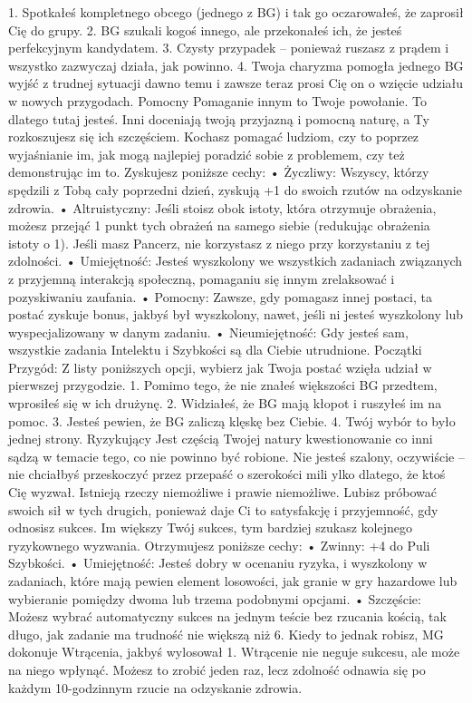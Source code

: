 1. Spotkałeś kompletnego obcego (jednego z BG) i tak go oczarowałeś, że zaprosił Cię do grupy.
2. BG szukali kogoś innego, ale przekonałeś ich, że jesteś perfekcyjnym kandydatem.
3. Czysty przypadek – ponieważ ruszasz z prądem i wszystko zazwyczaj działa, jak powinno.
4. Twoja charyzma pomogła jednego BG wyjść z trudnej sytuacji dawno temu i zawsze teraz prosi Cię on o wzięcie udziału w nowych przygodach.
Pomocny
Pomaganie innym to Twoje powołanie. To dlatego tutaj jesteś. Inni doceniają twoją przyjazną i pomocną naturę, a Ty rozkoszujesz się ich szczęściem. Kochasz pomagać ludziom, czy to poprzez wyjaśnianie im, jak mogą najlepiej poradzić sobie z problemem, czy też demonstrując im to.
Zyskujesz poniższe cechy:
    • Życzliwy: Wszyscy, którzy spędzili z Tobą cały poprzedni dzień, zyskują +1 do swoich rzutów na odzyskanie zdrowia.
    • Altruistyczny: Jeśli stoisz obok istoty, która otrzymuje obrażenia, możesz przejąć 1 punkt tych obrażeń na samego siebie (redukując obrażenia istoty o 1). Jeśli masz Pancerz, nie korzystasz z niego przy korzystaniu z tej zdolności.
    • Umiejętność: Jesteś wyszkolony we wszystkich zadaniach związanych z przyjemną interakcją społeczną, pomaganiu się innym zrelaksować i pozyskiwaniu zaufania.
    • Pomocny: Zawsze, gdy pomagasz innej postaci, ta postać zyskuje bonus, jakbyś był wyszkolony, nawet, jeśli ni jesteś wyszkolony lub wyspecjalizowany w danym zadaniu.
    • Nieumiejętność: Gdy jesteś sam, wszystkie zadania Intelektu i Szybkości są dla Ciebie utrudnione.
Początki Przygód: Z listy poniższych opcji, wybierz jak Twoja postać wzięła udział w pierwszej przygodzie.
1. Pomimo tego, że nie znałeś większości BG przedtem, wprosiłeś się w ich drużynę.
2. Widziałeś, że BG mają kłopot i ruszyłeś im na pomoc.
3. Jesteś pewien, że BG zaliczą klęskę bez Ciebie.
4. Twój wybór to było  jednej strony.
Ryzykujący
Jest częścią Twojej natury kwestionowanie co inni sądzą w temacie tego, co nie powinno być robione. Nie jesteś szalony, oczywiście – nie chciałbyś przeskoczyć przez przepaść o szerokości mili ylko dlatego, że ktoś Cię wyzwał. Istnieją rzeczy niemożliwe i prawie niemożliwe. Lubisz próbować swoich sił w tych drugich, ponieważ daje Ci to satysfakcję i przyjemność, gdy odnosisz sukces. Im większy Twój sukces, tym bardziej szukasz kolejnego ryzykownego wyzwania.
Otrzymujesz poniższe cechy:
    • Zwinny: +4 do Puli Szybkości.
    • Umiejętność: Jesteś dobry w ocenaniu ryzyka, i wyszkolony w zadaniach, które mają pewien element losowości, jak granie w gry hazardowe lub wybieranie pomiędzy dwoma lub trzema podobnymi opcjami.
    • Szczęście: Możesz wybrać automatyczny sukces na jednym teście bez rzucania kością, tak długo, jak zadanie ma trudność nie większą niż 6. Kiedy to jednak robisz, MG dokonuje Wtrącenia, jakbyś wylosował 1. Wtrącenie nie neguje sukcesu, ale może na niego wpłynąć. Możesz to zrobić jeden raz, lecz zdolność odnawia się po każdym 10-godzinnym rzucie na odzyskanie zdrowia.
